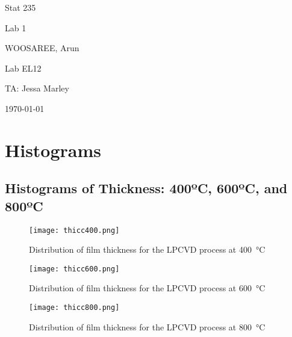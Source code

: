 \documentclass[letterpaper]{article}
\begin{document}
\begin{titlepage}
 \begin{center}
  \vspace*{1cm}
  \Huge
  Stat 235
  \vspace{1cm}
  
  Lab 1
  \vspace{1cm}
  
  WOOSAREE, Arun
  \vspace{1cm}
  
  \Huge
  Lab EL12
  \vspace{1cm}
  
  TA: Jessa Marley
  \vspace{1cm}
  
  \today
  \vfill
 \end{center}
\end{titlepage}

\section{Histograms}

\subsection{Histograms of Thickness: 400ºC, 600ºC, and 800ºC}

\begin{figure}[H]
 \centering
 \texttt{[image: thicc400.png]}
 \caption{Distribution of film thickness for the LPCVD process at \SI{400}{\celsius}}
 \label{thicc400}
\end{figure}

\begin{figure}[H]
 \centering
 \texttt{[image: thicc600.png]}
 \caption{Distribution of film thickness for the LPCVD process at \SI{600}{\celsius}}
 \label{thicc600}
\end{figure}

\begin{figure}[H]
 \centering
 \texttt{[image: thicc800.png]}
 \caption{Distribution of film thickness for the LPCVD process at \SI{800}{\celsius}}
 \label{thicc800}
\end{figure}
\end{document}
